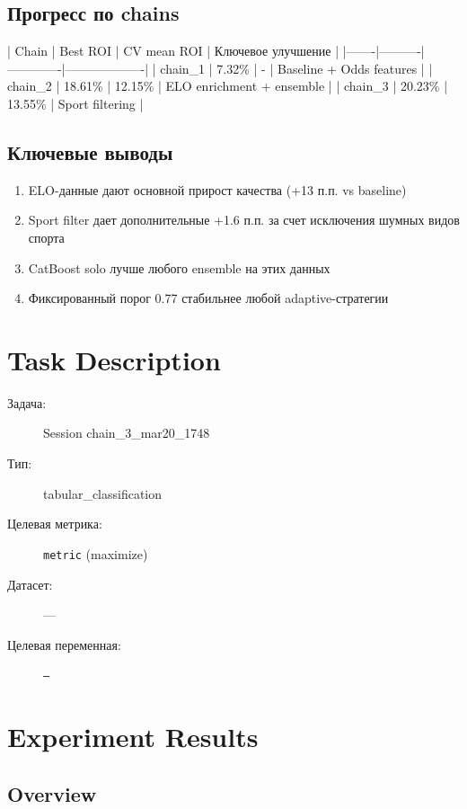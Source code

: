 \documentclass[12pt,a4paper]{article}
\begin{document}
\subsection{Прогресс по chains}
| Chain | Best ROI | CV mean ROI | Ключевое улучшение |
|-------|----------|-------------|-------------------|
| chain\_1 | 7.32\% | - | Baseline + Odds features |
| chain\_2 | 18.61\% | 12.15\% | ELO enrichment + ensemble |
| chain\_3 | 20.23\% | 13.55\% | Sport filtering |

\subsection{Ключевые выводы}
\begin{enumerate}
  \item ELO-данные дают основной прирост качества (+13 п.п. vs baseline)
  \item Sport filter дает дополнительные +1.6 п.п. за счет исключения шумных видов спорта
  \item CatBoost solo лучше любого ensemble на этих данных
  \item Фиксированный порог 0.77 стабильнее любой adaptive-стратегии
\end{enumerate}




\section{Task Description}

\begin{description}
    \item[Задача:] Session chain\_3\_mar20\_1748
    \item[Тип:] tabular\_classification
    \item[Целевая метрика:] \texttt{metric}
        (maximize)
    \item[Датасет:] ---
    \item[Целевая переменная:] \texttt{---}
\end{description}




\section{Experiment Results}

\subsection{Overview}
\end{document}
